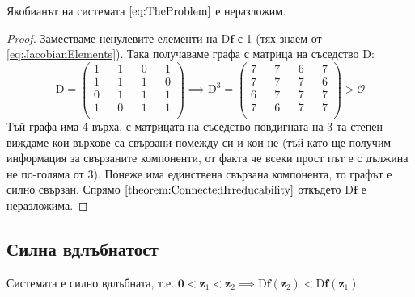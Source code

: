 \begin{proposition}
  Якобианът на системата $\ref{eq:TheProblem}$ е неразложим.
\end{proposition}
\begin{proof}
  Заместваме ненулевите елементи на $\mathrm{D} \mathbf{f}$ с 1 (тях знаем от \ref{eq:JacobianElements}). Така получаваме графа с матрица на съседство $\mathrm{D}$:
  \begin{equation}
    \mathrm{D} =
    \begin{pmatrix}
      1 && 1 && 0 && 1 \\
      1 && 1 && 1 && 0 \\
      0 && 1 && 1 && 1 \\
      1 && 0 && 1 && 1 \\
    \end{pmatrix}
    \implies
    \mathrm{D}^3 =
    \begin{pmatrix}
      7 && 7 && 6 && 7 \\
      7 && 7 && 7 && 6 \\
      6 && 7 && 7 && 7 \\
      7 && 6 && 7 && 7 \\
    \end{pmatrix}
    >
    \mathscr{O}
  \end{equation}
  Тъй графа има 4 върха, с матрицата на съседство повдигната на 3-та степен виждаме кои върхове са свързани помежду си и кои не (тъй като ще получим информация за свързаните компоненти, от факта че всеки прост път е с дължина не по-голяма от 3).
  Понеже има единствена свързана компонента, то графът е силно свързан.
  Спрямо $\ref{theorem:ConnectedIrreducability}$ откъдето $\mathrm{D}\mathbf{f}$ е неразложима.
  \end{proof}

\subsection{Силна вдлъбнатост}
\begin{proposition}
  Системата е силно вдлъбната, т.е. $\mathbf{0} < \mathbf{z}_1 < \mathbf{z}_2 \implies \mathrm{D}\mathbf{f}(\mathbf{z}_2) < \mathrm{D}\mathbf{f}(\mathbf{z}_1)$
\end{proposition}


